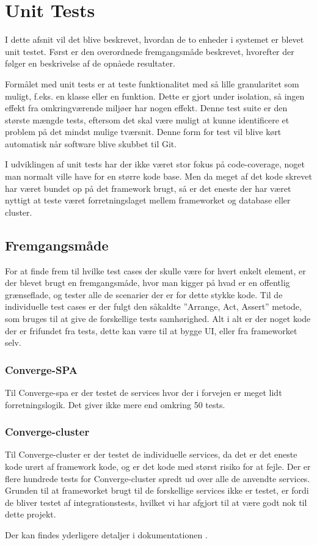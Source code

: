 
\section{Unit Tests}

I dette afsnit vil det blive beskrevet, hvordan de to enheder i systemet er blevet unit testet. Først er den overordnede fremgangsmåde beskrevet, hvorefter der følger en beskrivelse af de opnåede resultater. 

Formålet med unit tests er at teste funktionalitet med så lille granularitet som muligt, f.eks. en klasse eller en funktion. Dette er gjort under isolation, så ingen effekt fra omkringværende miljøer har nogen effekt. Denne test suite er den største mængde tests, eftersom det skal være muligt at kunne identificere et problem på det mindst mulige tværsnit. Denne form for test vil blive kørt automatisk når software blive skubbet til Git.

I udviklingen af unit tests har der ikke været stor fokus på code-coverage, noget man normalt ville have for en større kode base. Men da meget af det kode skrevet har været bundet op på det framework brugt, så er det eneste der har været nyttigt at teste været forretningslaget mellem frameworket og database eller cluster.


\subsection{Fremgangsmåde}

For at finde frem til hvilke test cases der skulle være for hvert enkelt element, er der blevet brugt en fremgangsmåde, hvor man kigger på hvad er en offentlig grænseflade, og tester alle de scenarier der er for dette stykke kode. Til de individuelle test cases er der fulgt den såkaldte ''Arrange, Act, Assert'' \cite{Arrange-Act-Assert} metode, som bruges til at give de forskellige tests samhørighed. Alt i alt er der noget kode der er frifundet fra tests, dette kan være til at bygge UI, eller fra frameworket selv.


\subsubsection{Converge-SPA}

Til Converge-spa er der testet de services hvor der i forvejen er meget lidt forretningslogik. Det giver ikke mere end omkring 50 tests.

\subsubsection{Converge-cluster}

Til Converge-cluster er der testet de individuelle services, da det er det eneste kode urørt af framework kode, og er det kode med størst risiko for at fejle. Der er flere hundrede tests for Converge-cluster spredt ud over alle de anvendte services. Grunden til at frameworket brugt til de forskellige services ikke er testet, er fordi de bliver testet af integrationstests, hvilket vi har afgjort til at være godt nok til dette projekt.

Der kan findes yderligere detaljer i dokumentationen \cite{unit-test}.
